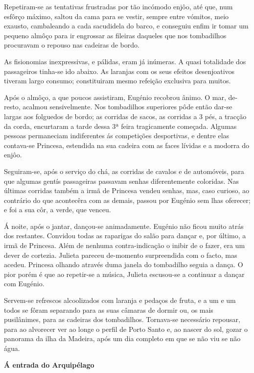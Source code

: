\documentclass[9pt]{article}
\begin{document}
Repetiram-se as tentativas frustradas por tão incómodo enjôo, até que,
num esfôrço máximo, saltou da cama para se vestir, sempre entre vómitos, meio
exausto, cambaleando a cada sacudidela do barco, e conseguiu enfim ir tomar
um pequeno almôço para ir engrossar as fileiras daqueles que nos tombadi\-lhos
procuravam o repouso nas cadeiras de bordo.

As fisionomias inexpressivas, e pálidas, eram já inúmeras. A quasi totalidade dos passageiros tinha-se ido abaixo. As laranjas com os seus efeitos
desenjoativos tiveram largo consumo; constituiram mesmo refei\-ção exclusiva
para muitos.

Após o almôço, a que poucos assistiram, Eugé\-nio recobrou ânimo. O mar,
de-resto, acalmou sensivelmente. Nos tombadi\-lhos superiores pôde então dar-se
largas aos folguedos de bordo; as corridas de sacos, as corridas a 3 pés, a
trac\-ção da corda, encurtaram a tarde dessa 3ª feira tragicamente começada.
Algumas pessoas permaneciam indiferentes ás competi\-ções desportivas, e dentre
elas contava-se Princesa, estendida na sua cadeira com as faces lívidas e a
modorra do enjôo.

Seguiram-se, após o serviço do chá, as corridas de cavalos
e de automóveis, para que algumas gentís passageiras passavam senhas diferentemente coloridas. Nas últimas corridas também a irmã de Princesa vendeu
senhas, mas, caso curioso, ao contrário do que acontecêra com as demais, passou
por Eugé\-nio sem lhas oferecer; e foi a sua côr, a verde, que venceu.

Á noite, após o jantar, dançou-se animadamente. Eugé\-nio não ficou muito
atrás dos restantes. Convidou todas as raparigas do salão para dan\-çar e, por
último, a irmã de Princesa. Além de nenhuma con\-\mbox{tra-indica\-ção} o inibir de o
fazer, era um dever de cortezia. Julieta pareceu de-momento surpreendida com o
facto, mas acedeu. Princesa o\-lhando através duma janela do tombadi\-lho seguia
a dan\-ça. O pior porém é que ao repetir-se a música, Julieta escusou-se a continuar a dan\-çar com Eugé\-nio.

Servem-se refrescos alcoolizados com laranja e pedaços de fruta, e a um
e um todos se fôram separando para as suas câmaras de dormir ou, os mais pusilânimes, para as cadeiras dos tombadi\-lhos. Tor\-na\mbox{va-se} necessário repousar,
para ao alvorecer ver ao longe o perfil de Porto Santo e, ao nascer do sol,
gozar o panorama da i\-lha da Madeira, após um dia completo em que se não viu
se não água.

\begin{center}\bf\large Á entrada do Arquipélago\end{center}
\end{document}
